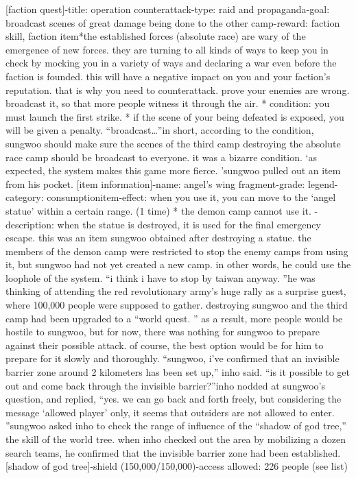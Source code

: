 [faction quest]-title: operation counterattack-type: raid and propaganda-goal: broadcast scenes of great damage being done to the other camp-reward: faction skill, faction item*the established forces (absolute race) are wary of the emergence of new forces.
 they are turning to all kinds of ways to keep you in check by mocking you in a variety of ways and declaring a war even before the faction is founded.
 this will have a negative impact on you and your faction’s reputation.
 that is why you need to counterattack.
 prove your enemies are wrong.
 broadcast it, so that more people witness it through the air.
* condition: you must launch the first strike.
* if the scene of your being defeated is exposed, you will be given a penalty.
“broadcast…”in short, according to the condition, sungwoo should make sure the scenes of the third camp destroying the absolute race camp should be broadcast to everyone.
 it was a bizarre condition.
‘as expected, the system makes this game more fierce.
’sungwoo pulled out an item from his pocket.
[item information]-name: angel’s wing fragment-grade: legend-category: consumptionitem-effect: when you use it, you can move to the ‘angel statue’ within a certain range.
 (1 time) * the demon camp cannot use it.
-description: when the statue is destroyed, it is used for the final emergency escape.
this was an item sungwoo obtained after destroying a statue.
 the members of the demon camp were restricted to stop the enemy camps from using it, but sungwoo had not yet created a new camp.
 in other words, he could use the loophole of the system.
“i think i have to stop by taiwan anyway.
”he was thinking of attending the red revolutionary army’s huge rally as a surprise guest, where 100,000 people were supposed to gather.
destroying sungwoo and the third camp had been upgraded to a “world quest.
” as a result, more people would be hostile to sungwoo, but for now, there was nothing for sungwoo to prepare against their possible attack.
 of course, the best option would be for him to prepare for it slowly and thoroughly.
“sungwoo, i’ve confirmed that an invisible barrier zone around 2 kilometers has been set up,” inho said.
“is it possible to get out and come back through the invisible barrier?”inho nodded at sungwoo’s question, and replied, “yes.
 we can go back and forth freely, but considering the message ‘allowed player’ only, it seems that outsiders are not allowed to enter.
”sungwoo asked inho to check the range of influence of the “shadow of god tree,” the skill of the world tree.
when inho checked out the area by mobilizing a dozen search teams, he confirmed that the invisible barrier zone had been established.
[shadow of god tree]-shield (150,000/150,000)-access allowed: 226 people (see list)

